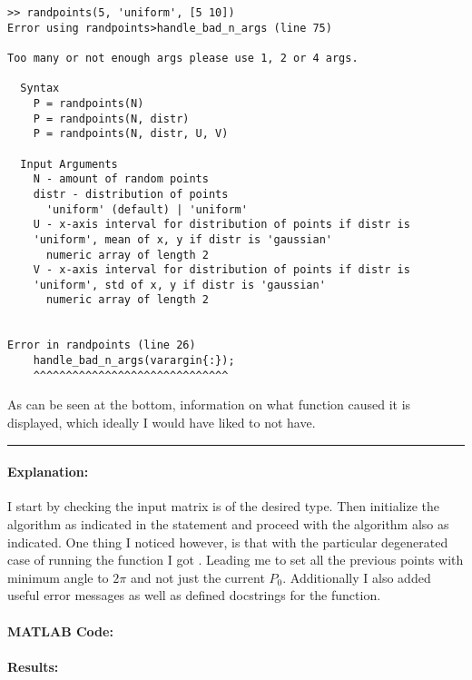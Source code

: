 \begin{verbatim}
>> randpoints(5, 'uniform', [5 10])
Error using randpoints>handle_bad_n_args (line 75)

Too many or not enough args please use 1, 2 or 4 args.

  Syntax
	P = randpoints(N)
	P = randpoints(N, distr)
	P = randpoints(N, distr, U, V)

  Input Arguments
	N - amount of random points
	distr - distribution of points
	  'uniform' (default) | 'uniform'
	U - x-axis interval for distribution of points if distr is
	'uniform', mean of x, y if distr is 'gaussian'
	  numeric array of length 2
	V - x-axis interval for distribution of points if distr is
	'uniform', std of x, y if distr is 'gaussian'
	  numeric array of length 2


Error in randpoints (line 26)
    handle_bad_n_args(varargin{:});
    ^^^^^^^^^^^^^^^^^^^^^^^^^^^^^^
\end{verbatim}

As can be seen at the bottom, information on what function caused it is displayed, which ideally I would have liked to not have.


\bigskip
\hrule



\paragraph{Explanation:}
I start by checking the input matrix is of the desired type.
Then initialize the algorithm as indicated in the statement and proceed with the algorithm also as indicated.
One thing I noticed however, is that with the particular degenerated case of \mttext{[1 1 1; 1 2 3]} running the function I got \mttext{[3     2     1     2     3]}.
Leading me to set all the previous points with minimum angle to $2 \pi $ and not just the current $P_0$.
Additionally I also added useful error messages as well as defined docstrings for the function.

\paragraph{MATLAB Code:}

\begin{tiny}
    
\end{tiny}

\paragraph{Results:}

